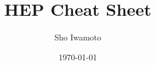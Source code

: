 \documentclass[a4paper,10pt,captions=tableheading,DIV=14]{scrartcl}
\title{HEP Cheat Sheet}
\date{\today}
\author{Sho Iwamoto}
\numberwithin{equation}{section}
\begin{document}
\nocite{PDG2018,PDG2020}


\clearpage

\clearpage

\clearpage

\clearpage

\clearpage

\clearpage

\clearpage

\clearpage

\clearpage

\clearpage

\clearpage
\appendix

\end{document}
